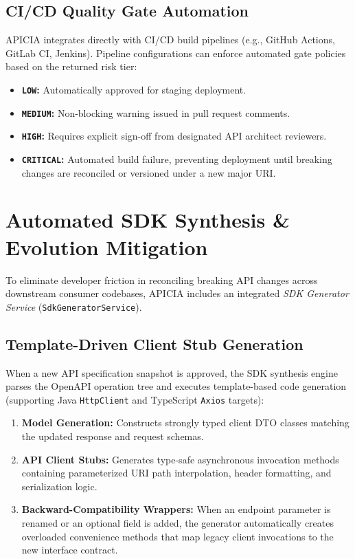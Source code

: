 \documentclass[conference]{IEEEtran}
\begin{document}
\subsection{CI/CD Quality Gate Automation}
APICIA integrates directly with CI/CD build pipelines (e.g., GitHub Actions, GitLab CI, Jenkins). Pipeline configurations can enforce automated gate policies based on the returned risk tier:
\begin{itemize}
    \item \textbf{\texttt{LOW}:} Automatically approved for staging deployment.
    \item \textbf{\texttt{MEDIUM}:} Non-blocking warning issued in pull request comments.
    \item \textbf{\texttt{HIGH}:} Requires explicit sign-off from designated API architect reviewers.
    \item \textbf{\texttt{CRITICAL}:} Automated build failure, preventing deployment until breaking changes are reconciled or versioned under a new major URI.
\end{itemize}

\section{Automated SDK Synthesis \& Evolution Mitigation}
\label{sec:sdk}

To eliminate developer friction in reconciling breaking API changes across downstream consumer codebases, APICIA includes an integrated \textit{SDK Generator Service} (\texttt{SdkGeneratorService}).

\subsection{Template-Driven Client Stub Generation}
When a new API specification snapshot is approved, the SDK synthesis engine parses the OpenAPI operation tree and executes template-based code generation (supporting Java \texttt{HttpClient} and TypeScript \texttt{Axios} targets):
\begin{enumerate}
    \item \textbf{Model Generation:} Constructs strongly typed client DTO classes matching the updated response and request schemas.
    \item \textbf{API Client Stubs:} Generates type-safe asynchronous invocation methods containing parameterized URI path interpolation, header formatting, and serialization logic.
    \item \textbf{Backward-Compatibility Wrappers:} When an endpoint parameter is renamed or an optional field is added, the generator automatically creates overloaded convenience methods that map legacy client invocations to the new interface contract.
\end{enumerate}
\end{document}
